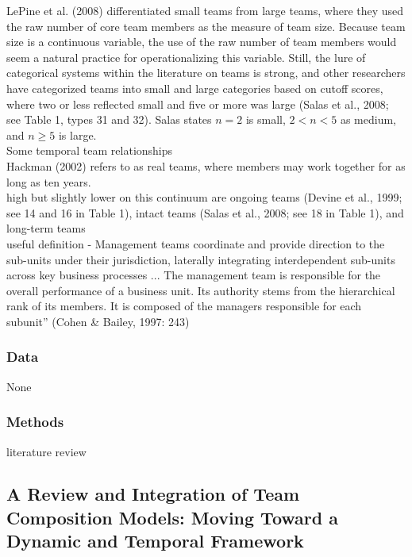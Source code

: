 \documentclass[12pt]{article}
\begin{document}
LePine et al. (2008) differentiated small teams from large teams, where they used the raw number of core team members as the measure of team size.\cite{meta_teamwork_processes} Because team size is a continuous variable, the use of the raw number of team members would seem a natural practice for operationalizing this variable. Still, the lure of categorical systems within the literature on teams is strong, and other researchers have categorized teams into small and large categories based on cutoff scores, where two or less reflected small and five or more was large (Salas et al., 2008; see Table 1, types 31 and 32). Salas states $n=2$ is small, $2 < n< 5$ as medium, and $n\geq 5$ is large.\cite{team_training}\\

Some temporal team relationships\\

Hackman (2002) refers to as real teams, where members may work together for as long as ten years. \\

high but slightly lower on this continuum are ongoing teams (Devine et al., 1999; see 14 and 16 in Table 1), intact teams (Salas et al., 2008; see 18 in Table 1), and long-term teams \\

useful definition - Management teams coordinate and provide direction to the sub-units under their jurisdiction, laterally integrating interdependent sub-units across key business processes ... The management team is responsible for the overall performance of a business unit. Its authority stems from the hierarchical rank of its members. It is composed of the managers responsible for each subunit” (Cohen \& Bailey, 1997: 243)


\subsubsection*{Data}

None

\subsubsection*{Methods}

literature review


\subsection*{A Review and Integration of Team Composition Models: Moving Toward a Dynamic and Temporal Framework\cite{dynamic_teams_review}}
\end{document}
